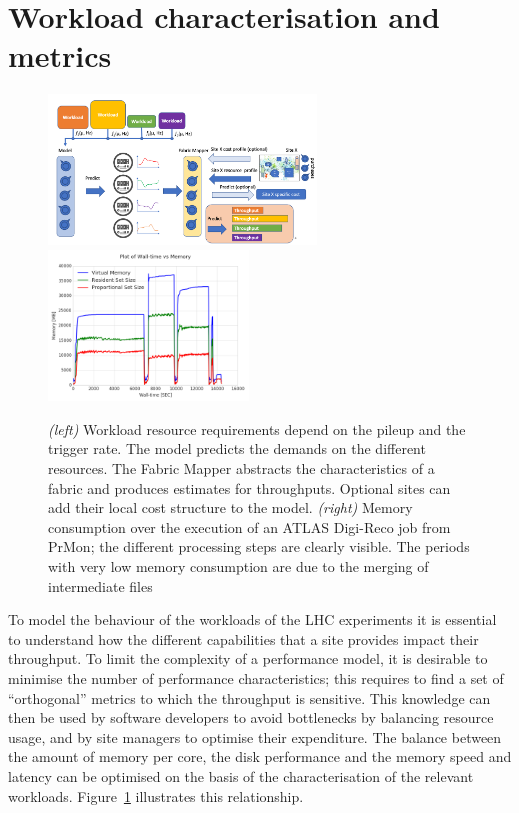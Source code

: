 \section{Workload characterisation and metrics}
\begin{figure}[h]
  \centering
  \includegraphics[height=4cm]{CHEP-Model-2.png}
  \hfill
  \includegraphics[height=4cm]{prmon.png}
  \caption{{\em (left)} Workload resource requirements depend on the
    pileup and the trigger rate. The model predicts the demands on the
    different resources. The Fabric Mapper abstracts the
    characteristics of a fabric and produces estimates for
    throughputs. Optional sites can add their local cost structure to
    the model. {\em (right)} Memory consumption over the execution of
    an ATLAS Digi-Reco job from PrMon; the different processing steps
    are clearly visible. The periods with very low memory consumption
    are due to the merging of intermediate files}
  \label{fig:mapping}
\end{figure}

To model the behaviour of the workloads of the LHC experiments it is
essential to understand how the different capabilities that a site
provides impact their throughput. To limit the complexity of a
performance model, it is desirable to minimise the number of
performance characteristics; this requires to find a set of
``orthogonal'' metrics to which the throughput is sensitive. This
knowledge can then be used by software developers to avoid bottlenecks
by balancing resource usage, and by site managers to optimise their
expenditure. The balance between the amount of memory per core, the
disk performance and the memory speed and latency can be optimised on
the basis of the characterisation of the relevant
workloads. Figure~\ref{fig:mapping} illustrates this relationship.

